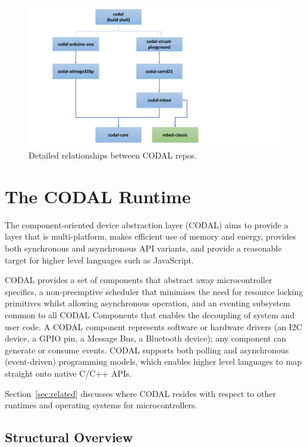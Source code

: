 \begin{figure}[t]
    \includegraphics[width=4.5in]{codalFig.pdf}
    \caption{\label{fig:codal}Detailed relationships between CODAL repos.}
\end{figure}

\section{The CODAL Runtime}
\label{sec:codal}

The component-oriented device abstraction layer (CODAL) aims to provide a layer that is multi-platform, makes efficient use of memory and energy, provides both synchronous and asynchronous API variants, and provide a reasonable target for higher level languages
such as JavaScript.

CODAL provides a set of components that abstract away microcontroller specifics, a non-preemptive scheduler that minimises the need for resource locking primitives whilst allowing asynchronous operation, and an eventing subsystem common to all CODAL Components that enables the decoupling of system and user code. A CODAL component represents software or hardware drivers (an I2C device, a GPIO pin, a Message Bus, a Bluetooth device); any component can generate or consume events. CODAL supports both polling and asynchronous (event-driven) programming models, which enables higher level languages to map straight onto native C/C++ APIs.

Section~\ref{sec:related} discusses where CODAL resides with respect to other runtimes and operating systems for microcontrollers.


\subsection{Structural Overview}

